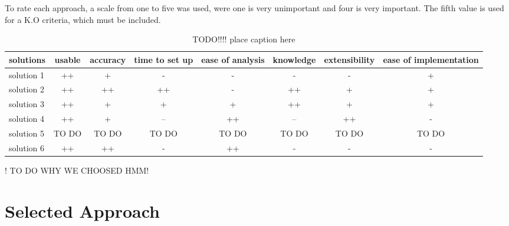To rate each approach, a scale from one to five was used, were one is very unimportant and four is very important. The fifth value is used for a K.O criteria, which must be included.

\begin{table}[h]
\begin{tabular}{|l|c|c|c|c|c|c|c|}
\hline
\textbf{solutions} & usable & accuracy & time to set up & ease of analysis & knowledge & extensibility & ease of implementation \\
\hline
solution 1 &\cellcolor[HTML]{38761d}++&\cellcolor[HTML]{93c47d}+&\cellcolor[HTML]{dd7e6b}-&\cellcolor[HTML]{dd7e6b}-&\cellcolor[HTML]{dd7e6b}-&\cellcolor[HTML]{dd7e6b}-&\cellcolor[HTML]{93c47d}+ \\
\hline
solution 2 &\cellcolor[HTML]{38761d}++&\cellcolor[HTML]{38761d}++&\cellcolor[HTML]{38761d}++&\cellcolor[HTML]{dd7e6b}-&\cellcolor[HTML]{38761d}++&\cellcolor[HTML]{93c47d}+&\cellcolor[HTML]{93c47d}+\\
\hline
solution 3 &\cellcolor[HTML]{38761d}++&\cellcolor[HTML]{93c47d}+&\cellcolor[HTML]{93c47d}+&\cellcolor[HTML]{93c47d}+&\cellcolor[HTML]{38761d}++&\cellcolor[HTML]{93c47d}+&\cellcolor[HTML]{93c47d}+\\
\hline
solution 4 &\cellcolor[HTML]{38761d}++&\cellcolor[HTML]{93c47d}+&\cellcolor[HTML]{cc4125}--&\cellcolor[HTML]{38761d}++&\cellcolor[HTML]{cc4125}--&\cellcolor[HTML]{38761d}++&\cellcolor[HTML]{dd7e6b}-\\
\hline
solution 5 &TO DO & TO DO & TO DO & TO DO & TO DO & TO DO & TO DO \\
\hline
solution 6 &\cellcolor[HTML]{38761d}++&\cellcolor[HTML]{38761d}++&\cellcolor[HTML]{dd7e6b}-&\cellcolor[HTML]{38761d}++&\cellcolor[HTML]{dd7e6b}-&\cellcolor[HTML]{dd7e6b}-&\cellcolor[HTML]{dd7e6b}-\\
\hline
\end{tabular}
\caption{ TODO!!!! place caption here }
\end{table}

! TO DO WHY WE CHOOSED HMM!

\section{Selected Approach}




